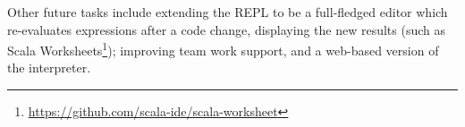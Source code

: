 Other future tasks include
extending the REPL to be a full-fledged editor which re-evaluates expressions after a code change, displaying the new results (such as Scala Worksheets\footnote{\url{https://github.com/scala-ide/scala-worksheet}});
improving team work support,
and a web-based version of the interpreter.


